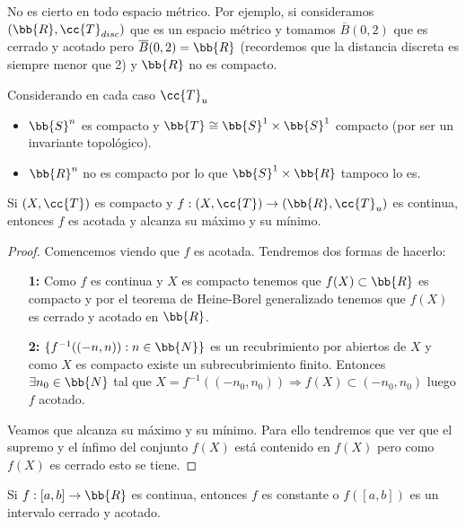 \begin{observacion}
    No es cierto en todo espacio métrico. Por ejemplo, si consideramos $(\bb{R}, \cc{T}_{disc})$ que es un espacio métrico y tomamos $\overline{B}(0,2)$ que es cerrado y acotado pero $\overline{B}(0,2)=\bb{R}$ (recordemos que la distancia discreta es siempre menor que 2) y $\bb{R}$ no es compacto.
    \endsquare
\end{observacion}

\begin{ejemplo}Considerando en cada caso $\cc{T}_u$
    \begin{itemize}
        \item $\bb{S}^n$ es compacto y $\bb{T}\cong \bb{S}^1\times \bb{S}^1$ compacto (por ser un invariante topológico).
        \item $\bb{R}^n$ no es compacto por lo que $\bb{S}^1\times \bb{R}$ tampoco lo es.
    \end{itemize}
    \endsquare
\end{ejemplo}

\begin{coro}
    Si $(X, \cc{T})$ es compacto y $f:(X, \cc{T})\to (\bb{R}, \cc{T}_u)$ es continua, entonces $f$ es acotada y alcanza su máximo y su mínimo.
    \begin{proof}
        Comencemos viendo que $f$ es acotada. Tendremos dos formas de hacerlo:

        \begin{itemize}
            \item[\textbf{1: }] Como $f$ es continua y $X$ es compacto tenemos que $f(X)\subset \bb{R}$ es compacto y por el teorema de Heine-Borel generalizado tenemos que $f(X)$ es cerrado y acotado en $\bb{R}$.
            \item[\textbf{2: }] $\{f^{-1}((-n,n)):n\in \bb{N}\}$ es un recubrimiento por abiertos de $X$ y como $X$ es compacto existe un subrecubrimiento finito. Entonces $\exists n_0\in \bb{N}$ tal que $X=f^{-1}((-n_0, n_0)) \Rightarrow f(X)\subset (-n_0, n_0)$ luego $f$ acotado.
        \end{itemize}
        
        Veamos que alcanza su máximo y su mínimo. Para ello tendremos que ver que el supremo y el ínfimo del conjunto $f(X)$ está contenido en $f(X)$ pero como $f(X)$ es cerrado esto se tiene.

    \end{proof}
\end{coro}

\begin{coro}
    Si $f:[a,b]\to \bb{R}$ es continua, entonces $f$ es constante o $f([a,b])$ es un intervalo cerrado y acotado.
    \endsquare
\end{coro}

